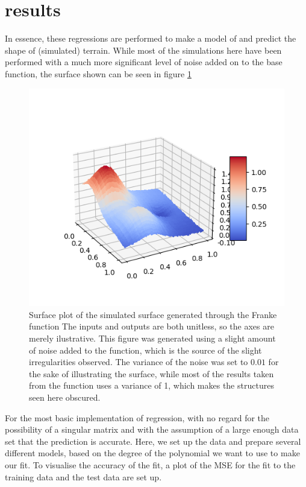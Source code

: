 \documentclass[12pt]{revtex4-2}
\begin{document}
\section{results}

In essence, these regressions are performed to make a model of and predict the shape of
(simulated) terrain. While most of the simulations here have been performed with a
much more significant level of noise added on to the base function, the surface shown
can be seen in figure \ref{fig:FrankeSurface}

\begin{figure}[hbtp]
\includegraphics[scale=0.7]{../plots/surfaceplotfrankeSigma01.png}
\caption{Surface plot of the simulated surface generated through the Franke function
	The inputs and outputs are both unitless, so the axes are merely ilustrative. 
	This figure was generated using a slight amount of noise added to the function, 
	which is the source of the slight irregularities observed. The variance of the 
	noise was set to $0.01$ for the sake of illustrating the surface, while most of the 
	results taken from the function uses a variance of 1, which makes the structures 
	seen here obscured.}
\label{fig:FrankeSurface}
\end{figure}

For the most basic implementation of regression, with no regard for the possibility of a
singular matrix and with the assumption of a large enough data set that the prediction 
is accurate. Here, we set up the data and prepare several different models, based on the
degree of the polynomial we want to use to make our fit. To visualise the accuracy of 
the fit, a plot of the MSE for the fit to the training data and the test data are set up.
\end{document}
